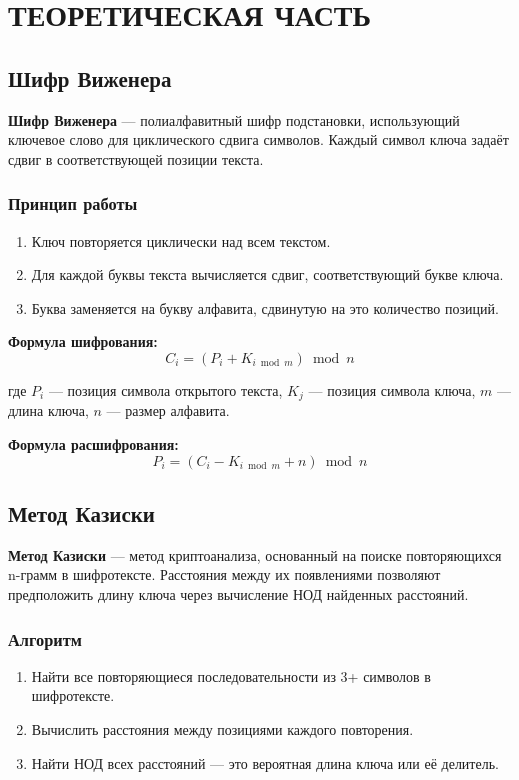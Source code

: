 \chapter*{ТЕОРЕТИЧЕСКАЯ ЧАСТЬ}

\section*{Шифр Виженера}

\textbf{Шифр Виженера} --- полиалфавитный шифр подстановки, использующий ключевое слово для циклического сдвига символов. Каждый символ ключа задаёт сдвиг в соответствующей позиции текста.

\subsection*{Принцип работы}

\begin{enumerate}
    \item Ключ повторяется циклически над всем текстом.
    \item Для каждой буквы текста вычисляется сдвиг, соответствующий букве ключа.
    \item Буква заменяется на букву алфавита, сдвинутую на это количество позиций.
\end{enumerate}

\textbf{Формула шифрования:}
$$C_i = (P_i + K_{i \bmod m}) \bmod n$$

где $P_i$ --- позиция символа открытого текста, $K_j$ --- позиция символа ключа, $m$ --- длина ключа, $n$ --- размер алфавита.

\textbf{Формула расшифрования:}
$$P_i = (C_i - K_{i \bmod m} + n) \bmod n$$

\section*{Метод Казиски}

\textbf{Метод Казиски} --- метод криптоанализа, основанный на поиске повторяющихся n-грамм в шифротексте. Расстояния между их появлениями позволяют предположить длину ключа через вычисление НОД найденных расстояний.

\subsection*{Алгоритм}

\begin{enumerate}
    \item Найти все повторяющиеся последовательности из 3+ символов в шифротексте.
    \item Вычислить расстояния между позициями каждого повторения.
    \item Найти НОД всех расстояний --- это вероятная длина ключа или её делитель.
\end{enumerate}

